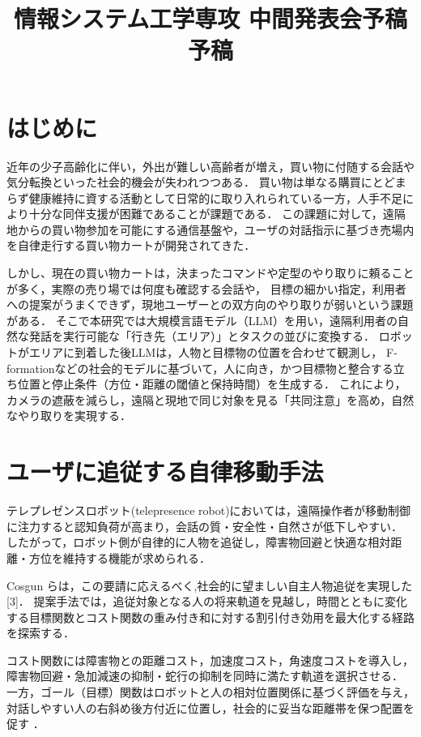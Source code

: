 \documentclass[dvipdfmx]{jarticle}
\title{
情報システム工学専攻 中間発表会予稿 予稿
}
\begin{document}
\maketitle

\section{はじめに}
 近年の少子高齢化に伴い，外出が難しい高齢者が増え，買い物に付随する会話や気分転換といった社会的機会が失われつつある．
 買い物は単なる購買にとどまらず健康維持に資する活動として日常的に取り入れられている一方，人手不足により十分な同伴支援が困難であることが課題である．
 この課題に対して，遠隔地からの買い物参加を可能にする通信基盤や，ユーザの対話指示に基づき売場内を自律走行する買い物カートが開発されてきた．
 
 しかし、現在の買い物カートは，決まったコマンドや定型のやり取りに頼ることが多く，実際の売り場では何度も確認する会話や，
 目標の細かい指定，利用者への提案がうまくできず，現地ユーザーとの双方向のやり取りが弱いという課題がある．
 そこで本研究では大規模言語モデル（LLM）を用い，遠隔利用者の自然な発話を実行可能な「行き先（エリア）」とタスクの並びに変換する．
 ロボットがエリアに到着した後LLMは，人物と目標物の位置を合わせて観測し，
 F-formationなどの社会的モデルに基づいて，人に向き，かつ目標物と整合する立ち位置と停止条件（方位・距離の閾値と保持時間）を生成する．
 これにより，カメラの遮蔽を減らし，遠隔と現地で同じ対象を見る「共同注意」を高め，自然なやり取りを実現する．

\section{ユーザに追従する自律移動手法}
  テレプレゼンスロボット(telepresence robot)においては，遠隔操作者が移動制御に注力すると認知負荷が高まり，会話の質・安全性・自然さが低下しやすい．
 したがって，ロボット側が自律的に人物を追従し，障害物回避と快適な相対距離・方位を維持する機能が求められる．

 Cosgun らは，この要請に応えるべく,社会的に望ましい自主人物追従を実現した [3]．
 提案手法では，追従対象となる人の将来軌道を見越し，時間とともに変化する目標関数とコスト関数の重み付き和に対する割引付き効用を最大化する経路を探索する．

 コスト関数には障害物との距離コスト，加速度コスト，角速度コストを導入し，障害物回避・急加減速の抑制・蛇行の抑制を同時に満たす軌道を選択させる．
 一方，ゴール（目標）関数はロボットと人の相対位置関係に基づく評価を与え，対話しやすい人の右斜め後方付近に位置し，社会的に妥当な距離帯を保つ配置を促す
 ．
\end{document}
